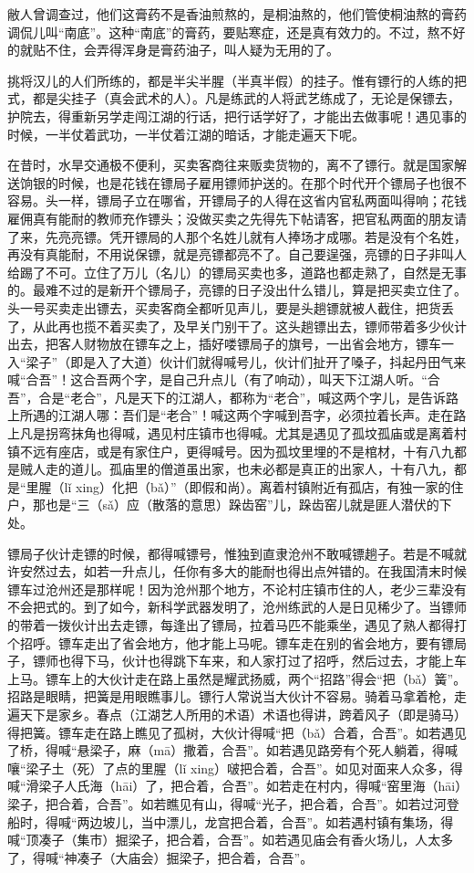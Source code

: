 \documentclass[12pt,UTF8]{ctexbook}
\begin{document}
敝人曾调查过，他们这膏药不是香油煎熬的，是桐油熬的，他们管使桐油熬的膏药调侃儿叫“南底”。这种“南底”的膏药，要贴寒症，还是真有效力的。不过，熬不好的就贴不住，会弄得浑身是膏药油子，叫人疑为无用的了。

挑将汉儿的人们所练的，都是半尖半腥（半真半假）的挂子。惟有镖行的人练的把式，都是尖挂子（真会武术的人）。凡是练武的人将武艺练成了，无论是保镖去，护院去，得重新另学走闯江湖的行话，把行话学好了，才能出去做事呢！遇见事的时候，一半仗着武功，一半仗着江湖的暗话，才能走遍天下呢。

在昔时，水旱交通极不便利，买卖客商往来贩卖货物的，离不了镖行。就是国家解送饷银的时候，也是花钱在镖局子雇用镖师护送的。在那个时代开个镖局子也很不容易。头一样，镖局子立在哪省，开镖局子的人得在这省内官私两面叫得响；花钱雇佣真有能耐的教师充作镖头；没做买卖之先得先下帖请客，把官私两面的朋友请了来，先亮亮镖。凭开镖局的人那个名姓儿就有人捧场才成哪。若是没有个名姓，再没有真能耐，不用说保镖，就是亮镖都亮不了。自己要逞强，亮镖的日子非叫人给踢了不可。立住了万儿（名儿）的镖局买卖也多，道路也都走熟了，自然是无事的。最难不过的是新开个镖局子，亮镖的日子没出什么错儿，算是把买卖立住了。头一号买卖走出镖去，买卖客商全都听见声儿，要是头趟镖就被人截住，把货丢了，从此再也揽不着买卖了，及早关门别干了。这头趟镖出去，镖师带着多少伙计出去，把客人财物放在镖车之上，插好喽镖局子的旗号，一出省会地方，镖车一入“梁子”（即是入了大道）伙计们就得喊号儿，伙计们扯开了嗓子，抖起丹田气来喊“合吾”！这合吾两个字，是自己升点儿（有了响动），叫天下江湖人听。“合吾”，合是“老合”，凡是天下的江湖人，都称为“老合”，喊这两个字儿，是告诉路上所遇的江湖人哪：吾们是“老合”！喊这两个字喊到吾字，必须拉着长声。走在路上凡是拐弯抹角也得喊，遇见村庄镇市也得喊。尤其是遇见了孤坟孤庙或是离着村镇不远有座店，或是有家住户，更得喊号。因为孤坟里埋的不是棺材，十有八九都是贼人走的道儿。孤庙里的僧道虽出家，也未必都是真正的出家人，十有八九，都是“里腥（lǐ xing）化把（bǎ）”（即假和尚）。离着村镇附近有孤店，有独一家的住户，那也是“三（sǎ）应（散落的意思）跺齿窑”儿，跺齿窑儿就是匪人潜伏的下处。

镖局子伙计走镖的时候，都得喊镖号，惟独到直隶沧州不敢喊镖趟子。若是不喊就许安然过去，如若一升点儿，任你有多大的能耐也得出点舛错的。在我国清末时候镖车过沧州还是那样呢！因为沧州那个地方，不论村庄镇市住的人，老少三辈没有不会把式的。到了如今，新科学武器发明了，沧州练武的人是日见稀少了。当镖师的带着一拨伙计出去走镖，每逢出了镖局，拉着马匹不能乘坐，遇见了熟人都得打个招呼。镖车走出了省会地方，他才能上马呢。镖车走在别的省会地方，要有镖局子，镖师也得下马，伙计也得跳下车来，和人家打过了招呼，然后过去，才能上车上马。镖车上的大伙计走在路上虽然是耀武扬威，两个“招路”得会“把（bǎ）簧”。招路是眼睛，把簧是用眼瞧事儿。镖行人常说当大伙计不容易。骑着马拿着枪，走遍天下是家乡。春点（江湖艺人所用的术语）术语也得讲，跨着风子（即是骑马）得把簧。镖车走在路上瞧见了孤树，大伙计得喊“把（bǎ）合着，合吾”。如若遇见了桥，得喊“悬梁子，麻（mā）撒着，合吾”。如若遇见路旁有个死人躺着，得喊嚷“梁子土（死）了点的里腥（lǐ xing）啵把合着，合吾”。如见对面来人众多，得喊“滑梁子人氏海（hāi）了，把合着，合吾”。如若走在村内，得喊“窑里海（hāi）梁子，把合着，合吾”。如若瞧见有山，得喊“光子，把合着，合吾”。如若过河登船时，得喊“两边坡儿，当中漂儿，龙宫把合着，合吾”。如若遇村镇有集场，得喊“顶凑子（集市）掘梁子，把合着，合吾”。如若遇见庙会有香火场儿，人太多了，得喊“神凑子（大庙会）掘梁子，把合着，合吾”。
\end{document}
